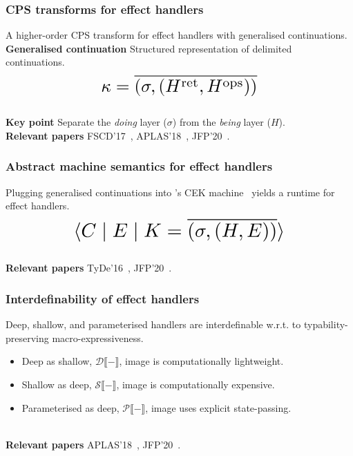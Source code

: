 \documentclass[169,10pt,compress,dvipsnames]{beamer}
\newcommand*{\Scale}[2][4]{\scalebox{#1}{\ensuremath{#2}}}%
\begin{document}
\begin{frame}
  \frametitle{CPS transforms for effect handlers}

  A higher-order CPS transform for effect handlers with generalised
  continuations.\\[1em]

  \textbf{Generalised continuation} Structured representation of
  delimited continuations.\\[0.5em]

  \[
    \Scale[1.8]{\kappa = \overline{(\sigma, (\hret,\hops))}}
  \]\\[1em]

  \textbf{Key point} Separate the \emph{doing} layer ($\sigma$) from the \emph{being} layer ($H$).\\[2em]

  \textbf{Relevant papers} FSCD'17~\cite{HillerstromLAS17},
  APLAS'18~\cite{HillerstromL18}, JFP'20~\cite{HillerstromLA20}.
\end{frame}

\begin{frame}
  \frametitle{Abstract machine semantics for effect handlers}

  Plugging generalised continuations into \citeauthor{FelleisenF86}'s
  CEK machine~\cite{FelleisenF86} yields a runtime for effect
  handlers.\\[2em]

  \[
    \Scale[2]{\cek{C \mid E \mid K = \overline{(\sigma, (H,E))}}}
  \]\\[2em]

  \textbf{Relevant papers} TyDe'16~\cite{HillerstromL16},
  JFP'20~\cite{HillerstromLA20}.

\end{frame}

\begin{frame}
  \frametitle{Interdefinability of effect handlers}

  Deep, shallow, and parameterised handlers are interdefinable
  w.r.t. to typability-preserving macro-expressiveness.

  \begin{itemize}
    \item Deep as shallow, $\mathcal{D}\llbracket - \rrbracket$, image is computationally lightweight.
    \item Shallow as deep, $\mathcal{S}\llbracket - \rrbracket$, image is computationally expensive.
    \item Parameterised as deep, $\mathcal{P}\llbracket - \rrbracket$,
      image uses explicit state-passing.
    \end{itemize}
    ~\\[1em]
    \textbf{Relevant papers} APLAS'18~\cite{HillerstromL18},
    JFP'20~\cite{HillerstromLA20}.

\end{frame}
\end{document}
